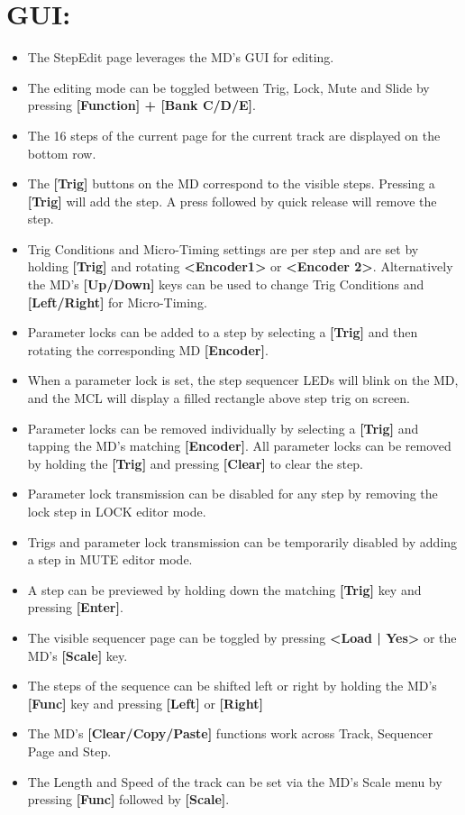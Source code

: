 \section{GUI:}
\begin{itemize}
\item The StepEdit page leverages the MD's GUI for editing.
\item The editing mode can be toggled between Trig, Lock, Mute and Slide by pressing \textbf{[Function] + [Bank C/D/E]}.
\item The 16 steps of the current page for the current track are displayed on the bottom row.
\item The \textbf{[Trig]} buttons on the MD correspond to the visible steps. Pressing a \textbf{[Trig]} will add the step. A press followed by quick release will remove the step. 
\item Trig Conditions and Micro-Timing settings are per step and are set by holding \textbf{[Trig]} and rotating \textbf{<Encoder1>} or \textbf{<Encoder 2>}. Alternatively the MD's \textbf{[Up/Down]} keys can be used to change Trig Conditions and \textbf{[Left/Right]} for Micro-Timing.
\item Parameter locks can be added to a step by selecting a \textbf{[Trig]} and then rotating the corresponding MD \textbf{[Encoder]}.
\item When a parameter lock is set, the step sequencer LEDs will blink on the MD, and the MCL will display a filled rectangle above step trig on screen.
\item Parameter locks can be removed individually by selecting a \textbf{[Trig]} and tapping the MD's matching \textbf{[Encoder]}. All parameter locks can be removed by holding the \textbf{[Trig]} and pressing \textbf{[Clear]} to clear the step.
\item Parameter lock transmission can be disabled for any step by removing the lock step in LOCK editor mode.
\item Trigs and parameter lock transmission can be temporarily disabled by adding a step in MUTE editor mode.
\item A step can be previewed by holding down the matching \textbf{[Trig]} key and pressing \textbf{[Enter]}.
\item The visible sequencer page can be toggled by pressing \textbf{<Load | Yes>} or the MD's \textbf{[Scale]} key.
\item The steps of the sequence can be shifted left or right by holding the MD's \textbf{[Func]} key and pressing \textbf{[Left]} or \textbf{[Right]}
\item The MD's \textbf{[Clear/Copy/Paste]} functions work across Track, Sequencer Page and Step.
\item The Length and Speed of the track can be set via the MD's Scale menu by pressing
\textbf{[Func]} followed by \textbf{[Scale]}.

\end{itemize}
\newpage
